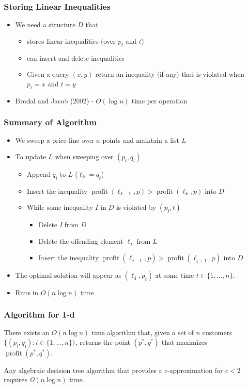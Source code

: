 \documentclass{beamer}
\DeclareMathOperator{\val}{profit}
\begin{document}
\frame
{
  \frametitle{Storing Linear Inequalities}
  \begin{itemize}
    \item We need a structure $D$ that 
    \begin{itemize}
      \item stores linear inequalities (over $p_t$ and $t$)
      \item can insert and delete inequalities
      \item Given a query $(x,y)$ return an inequality (if any) that is
         violated when $p_t=x$ and $t=y$
    \end{itemize}
    \item Brodal and Jacob (2002) - $O(\log n)$ time per operation
  \end{itemize}
}

\frame
{
  \frametitle{Summary of Algorithm}
  \begin{itemize}
    \item We sweep a price-line over $n$ points and maintain a list $L$
    \item To update $L$ when sweeping over $(p_t,q_t)$
    \begin{itemize}
      \item Append $q_i$ to $L$ ($\ell_k = q_t$)
      \item Insert the inequality $\val(\ell_{k-1}, p) > \val(\ell_{k},p)$
            into $D$
      \item While some inequality $I$ in $D$ is violated by $(p_t,t)$
      \begin{itemize}
        \item Delete $I$ from $D$
        \item Delete the offending element $\ell_j$ from $L$
        \item Insert the inequality $\val(\ell_{j-1}, p) >
\val(\ell_{j+1},p)$ into $D$
      \end{itemize}
    \end{itemize}
    \item<2-> The optimal solution will appear as $(\ell_1,p_t)$ at some time
       $t\in\{1,\ldots,n\}$.
    \item<3-> Runs in $O(n\log n)$ time
  \end{itemize}
}

\frame
{
  \frametitle{Algorithm for 1-d}

  \begin{thm}
    There exists an $O(n\log n)$ time algorithm that, given a set of $n$ customers
$\{(p_i,q_i) : i\in\{1,\ldots,n\}\}$, returns the point $(p^*,q^*)$ that
maximizes $\val(p^*,q^*)$.
  \end{thm}

  \begin{thm}
    Any algebraic decision tree algorithm that provides a $c$-approximation
for $c<2$ requires $\Omega(n\log n)$ time.
  \end{thm}
}
\end{document}
